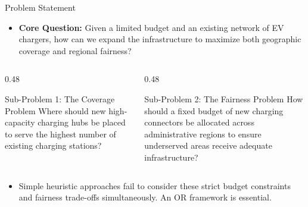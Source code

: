 \documentclass[aspectratio=169,10pt]{beamer}
\begin{document}
\begin{frame}{Problem Statement}

\vspace{0.25cm}

\begin{itemize}

    \item \textbf{Core Question:} Given a limited budget and an existing network of EV chargers, how can we expand the infrastructure to maximize both geographic coverage and regional fairness?

\end{itemize}

\vspace{0.3cm}

\begin{columns}[T]
\begin{column}{0.48\textwidth}
\begin{block}{Sub-Problem 1: The Coverage Problem}
\vspace{2mm}
Where should new high-capacity charging hubs be placed to serve the highest number of existing charging stations?
\vspace{2mm}
\end{block}
\end{column}

\begin{column}{0.48\textwidth}
\begin{block}{Sub-Problem 2: The Fairness Problem}
\vspace{2mm}
How should a fixed budget of new charging connectors be allocated across administrative regions to ensure underserved areas receive adequate infrastructure?
\vspace{2mm}
\end{block}
\end{column}
\end{columns}

\vspace{0.3cm}
\begin{itemize}
    \item Simple heuristic approaches fail to consider these strict budget constraints and fairness trade-offs simultaneously. An OR framework is essential.
\end{itemize}

\end{frame}
\end{document}
